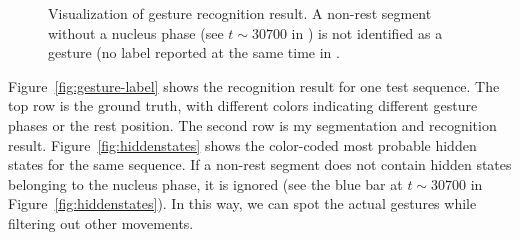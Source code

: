 \begin{figure}[!tbh]
\centering
{}
\caption{Visualization of gesture recognition result. A non-rest segment
without a nucleus phase (see $t\sim 30700$ in ) is not
identified as a gesture (no label reported at the same time in
.}
\end{figure}

Figure~\ref{fig:gesture-label} shows the recognition result for
one test sequence. The top row is the ground truth, with different colors
indicating different gesture phases or the rest position.
The second row is my segmentation and recognition result.
Figure~\ref{fig:hiddenstates} shows the color-coded most probable hidden states
for the same sequence.
If a non-rest segment does not contain hidden states belonging to the nucleus
phase, it is ignored (see the blue bar at $t\sim 30700$ in Figure~\ref{fig:hiddenstates}).
In this way, we can spot the actual gestures while filtering out other movements.

